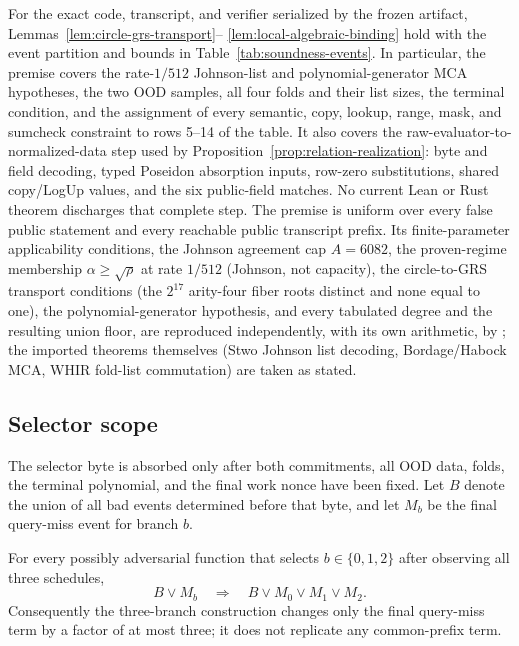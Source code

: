 \begin{assumption}
\label{ass:pinned-finite-reduction}
For the exact code, transcript, and verifier serialized by the frozen
artifact, Lemmas~\ref{lem:circle-grs-transport}--
\ref{lem:local-algebraic-binding} hold with the event partition and bounds in
Table~\ref{tab:soundness-events}.  In particular, the premise covers the
rate-\(1/512\) Johnson-list and polynomial-generator MCA hypotheses, the two
OOD samples, all four folds and their list sizes, the terminal condition, and
the assignment of every semantic, copy, lookup, range, mask, and sumcheck
constraint to rows 5--14 of the table.  It also covers the raw-evaluator-to-
normalized-data step used by Proposition~\ref{prop:relation-realization}:
byte and field decoding, typed Poseidon absorption inputs, row-zero
substitutions, shared copy/LogUp values, and the six public-field matches.  No
current Lean or Rust theorem discharges that complete step.  The premise is
uniform over every false public statement and every reachable public transcript prefix.  Its
finite-parameter applicability conditions, the Johnson agreement cap
\(A=6082\), the proven-regime membership \(\alpha\ge\sqrt\rho\) at rate
\(1/512\) (Johnson, not capacity), the circle-to-GRS transport conditions (the
\(2^{17}\) arity-four fiber roots distinct and none equal to one), the
polynomial-generator hypothesis, and every tabulated degree and the resulting
union floor, are reproduced independently, with its own arithmetic, by
; the imported theorems themselves
(Stwo Johnson list decoding, Bordage/Habock MCA, WHIR fold-list commutation)
are taken as stated.
\end{assumption}

\subsection{Selector scope}

The selector byte is absorbed only after both commitments, all OOD data,
folds, the terminal polynomial, and the final work nonce have been fixed.
Let \(B\) denote the union of all bad events determined before that byte, and
let \(M_b\) be the final query-miss event for branch \(b\).

\begin{lemma}
\label{lem:selector-soundness}
For every possibly adversarial function that selects
\(b\in\{0,1,2\}\) after observing all three schedules,
\[
 B\lor M_b\quad\Longrightarrow\quad B\lor M_0\lor M_1\lor M_2.
\]
Consequently the three-branch construction changes only the final query-miss
term by a factor of at most three; it does not replicate any common-prefix
term.
\end{lemma}

